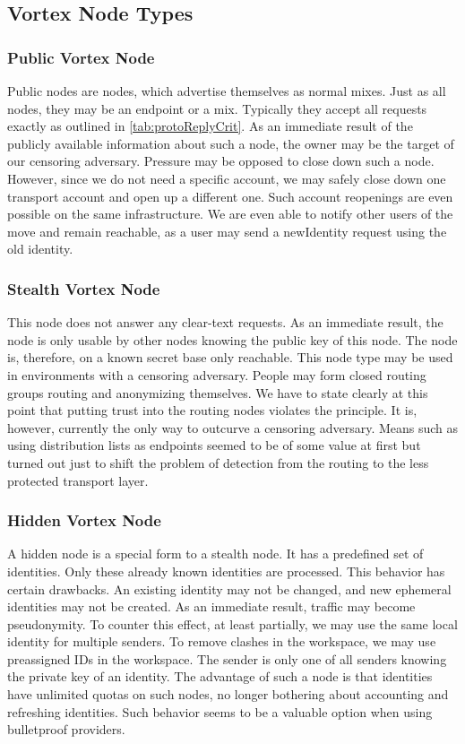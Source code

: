 \subsection{Vortex Node Types}\label{sec:vortexNodeTypes}

\subsubsection{Public Vortex Node}
Public nodes are nodes, which advertise themselves as normal mixes. Just as all nodes, they may be an endpoint or a mix. Typically they accept all requests exactly as outlined in \ref{tab:protoReplyCrit}. As an immediate result of the publicly available information about such a node, the owner may be the target of our censoring adversary. Pressure may be opposed to close down such a node. However, since we do not need a specific account, we may safely close down one transport account and open up a different one. Such account reopenings are even possible on the same infrastructure. We are even able to notify other users of the move and remain reachable, as a user may send a newIdentity request using the old identity. 

\subsubsection{Stealth Vortex Node}\label{sec:stealthNode}
This node does not answer any clear-text requests. As an immediate result, the node is only usable by other nodes knowing the public key of this node. The node is, therefore, on a known secret base only reachable. This node type may be used in environments with a censoring adversary. People may form closed routing groups routing and anonymizing themselves. We have to state clearly at this point that putting trust into the routing nodes violates the  principle. It is, however, currently the only way to outcurve a censoring adversary. Means such as using distribution lists as endpoints seemed to be of some value at first but turned out just to shift the problem of detection from the routing to the less protected transport layer.

\subsubsection{Hidden Vortex Node\label{sec:hiddenNode}}
A hidden node is a special form to a stealth node. It has a predefined set of identities. Only these already known identities are processed. This behavior has certain drawbacks. An existing identity may not be changed, and new ephemeral identities may not be created. As an immediate result, traffic may become pseudonymity. To counter this effect, at least partially, we may use the same local identity for multiple senders. To remove clashes in the workspace, we may use preassigned IDs in the workspace. The sender is only one of all senders knowing the private key of an identity. The advantage of such a node is that identities have unlimited quotas on such nodes, no longer bothering about accounting and refreshing identities. Such behavior seems to be a valuable option when using bulletproof providers.

